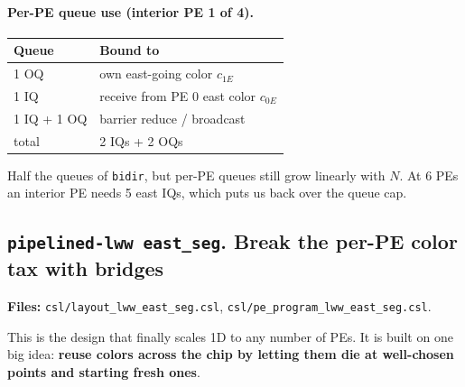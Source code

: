 \documentclass[11pt]{article}
\newcommand{\code}[1]{\texttt{#1}}
\newcommand{\file}[1]{\texttt{#1}}
\begin{document}
\begin{center}
\end{center}

\paragraph{Per-PE queue use (interior PE 1 of 4).}
\begin{center}\footnotesize
\begin{tabular}{ll}
\toprule
Queue & Bound to \\
\midrule
1 OQ & own east-going color $c_{1E}$ \\
1 IQ & receive from PE 0 east color $c_{0E}$ \\
1 IQ + 1 OQ & barrier reduce / broadcast \\
\midrule
total & 2 IQs + 2 OQs \\
\bottomrule
\end{tabular}
\end{center}

Half the queues of \code{bidir}, but per-PE queues still grow
linearly with $N$. At 6 PEs an interior PE needs 5 east IQs,
which puts us back over the queue cap.

\subsection{\code{pipelined-lww east\_seg}. Break the per-PE color tax with bridges}
\label{sec:east_seg}
\textbf{Files:} \file{csl/layout\_lww\_east\_seg.csl},
\file{csl/pe\_program\_lww\_east\_seg.csl}.

This is the design that finally scales 1D to any number of PEs.
It is built on one big idea: \textbf{reuse colors across the
chip by letting them die at well-chosen points and starting
fresh ones}.
\end{document}
